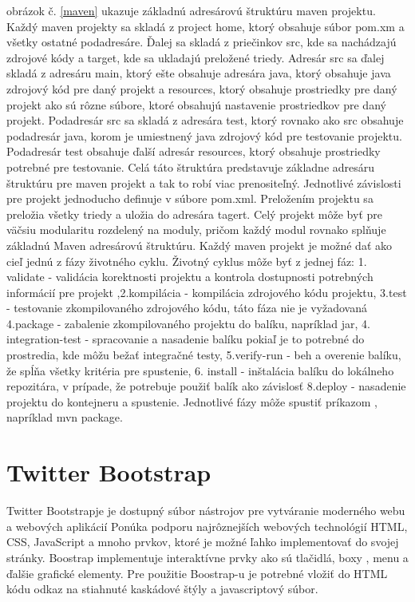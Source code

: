 obrázok č. \ref{maven} ukazuje základnú adresárovú štruktúru maven projektu. Každý maven projekty sa skladá z project home, ktorý obsahuje súbor pom.xm a všetky ostatné podadresáre. Ďalej sa skladá z priečinkov src, kde sa nachádzajú zdrojové kódy a target, kde sa ukladajú preložené triedy\cite{mavenbook}. Adresár src sa ďalej skladá z adresáru main, ktorý ešte obsahuje adresára java, ktorý obsahuje java zdrojový kód pre daný projekt a resources, ktorý obsahuje prostriedky pre daný projekt ako sú rôzne súbore, ktoré obsahujú nastavenie prostriedkov pre daný projekt. Podadresár src sa skladá z adresára test, ktorý rovnako ako src obsahuje podadresár java, korom je umiestnený java zdrojový kód pre testovanie projektu. Podadresár test obsahuje ďalší adresár resources, ktorý obsahuje prostriedky potrebné pre testovanie. Celá táto štruktúra predstavuje základne adresáru štruktúru pre maven projekt a tak to robí viac prenositeľný. Jednotlivé závislosti pre projekt jednoducho definuje v súbore pom.xml. Preložením projektu sa preložia všetky triedy a uložia do adresára tagert. Celý projekt môže byť pre väčsiu modularitu rozdelený na moduly, pričom každý modul rovnako splňuje základnú Maven adresárovú štruktúru. Každý maven projekt je možné dať ako cieľ jednú z fázy životného cyklu. Životný cyklus môže byť z jednej fáz: 1. validate - validácia korektnosti projektu a kontrola dostupnosti potrebných informácií pre projekt ,2.kompilácia - kompilácia zdrojového kódu projektu, 3.test - testovanie zkompilovaného zdrojového kódu, táto fáza nie je vyžadovaná 4.package - zabalenie zkompilovaného projektu do balíku, napríklad jar, 4. integration-test - spracovanie a nasadenie balíku pokiaľ je to potrebné do prostredia, kde môžu bežať integračné testy, 5.verify-run - beh a overenie balíku, že spĺňa všetky kritéria pre spustenie, 6. install - inštalácia balíku do lokálneho repozitára, v prípade, že potrebuje použiť balík ako závislosť 8.deploy - nasadenie projektu do kontejneru a spustenie.
Jednotlivé fázy môže spustiť príkazom , napríklad mvn package.

\section{Twitter Bootstrap}\label{bootkap}
Twitter Bootstrapje je dostupný súbor nástrojov pre vytváranie moderného webu a webových aplikácií\cite{boot.} Ponúka podporu najrôznejších webových technológií HTML, CSS, JavaScript a mnoho prvkov, ktoré je možné ľahko implementovať do svojej stránky. Boostrap implementuje interaktívne prvky ako sú tlačidlá, boxy , menu a ďalšie grafické elementy. Pre použitie Boostrap-u je potrebné vložiť do HTML kódu odkaz  na stiahnuté kaskádové štýly a javascriptový súbor.

